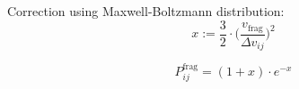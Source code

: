         Correction using Maxwell-Boltzmann distribution:
        \begin{equation}
            x:=\frac{3}{2}\cdot\bigg(
                \frac{v_\text{frag}}{\Delta v_{ij}}
            \bigg)^2
        \end{equation}
        
        \begin{equation}
            P^\text{frag}_{ij}=(1+x)\cdot e^{-x}
        \end{equation}

        



        

        
        
        

